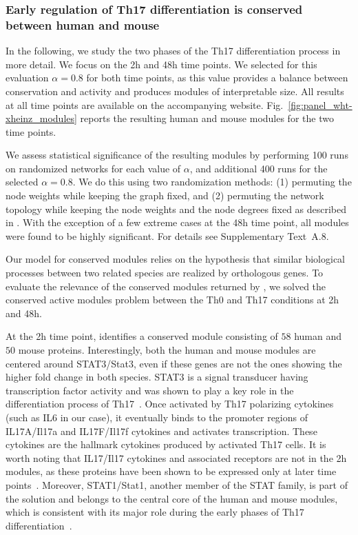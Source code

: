 \subsubsection{Early regulation of Th17 differentiation is conserved between human and mouse}
\label{sub:main_regulation_of_th17_differentiation_is_conserved_between_human_and_mouse}

In the following, we study the two phases of the Th17 differentiation process in more detail.
We focus on the \unit{2}{h} and \unit{48}{h} time points.
We selected for this evaluation $\alpha=0.8$ for both time points, as this value provides a balance between conservation and activity and produces modules of interpretable size.
All results at all time points are available on the accompanying website.
Fig.~\ref{fig:panel_wht-xheinz_modules} reports the resulting human and mouse modules for the two time points.

We assess statistical significance of the resulting modules by performing 100 runs on randomized networks for each value of $\alpha$, and additional 400 runs for the selected $\alpha=0.8$.
We do this using two randomization methods: (1) permuting the node weights while keeping the graph fixed, and (2) permuting the network topology while keeping the node weights and the node degrees fixed as described in \parencite{mihail2003markov}.
With the exception of a few extreme cases at the \unit{48}{h} time point, all modules were found to be highly significant.
For details see Supplementary Text~A.8.

Our model for conserved modules relies on the hypothesis that similar biological processes between two related species are realized by orthologous genes.
To evaluate the relevance of the conserved modules returned by \xheinz, we solved the conserved active modules problem between the Th0 and Th17 conditions at \unit{2}{h} and \unit{48}{h}.

At the \unit{2}{h} time point, \xheinz{} identifies a conserved module consisting of $58$ human and $50$ mouse proteins.
Interestingly, both the human and mouse modules are centered around STAT3/Stat3, even if these genes are not the ones showing the higher fold change in both species.
STAT3 is a signal transducer having transcription factor activity and was shown to play a key role in the differentiation process of Th17~\parencite{harris2007cutting}.
Once activated by Th17 polarizing cytokines (such as IL6 in our case), it eventually binds to the promoter regions of IL17A/Il17a and IL17F/Il17f cytokines and activates transcription.
These cytokines are the hallmark cytokines produced by activated Th17 cells.
It is worth noting that IL17/Il17 cytokines and associated receptors are not in the \unit{2}{h} modules, as these proteins have been shown to be expressed only at later time points~\parencite{tuomela2012identification}.
Moreover, STAT1/Stat1, another member of the STAT family, is part of the solution and belongs to the central core of the human and mouse modules, which is consistent with its major role during the early phases of Th17 differentiation~\parencite{yosef2013dynamic}.


